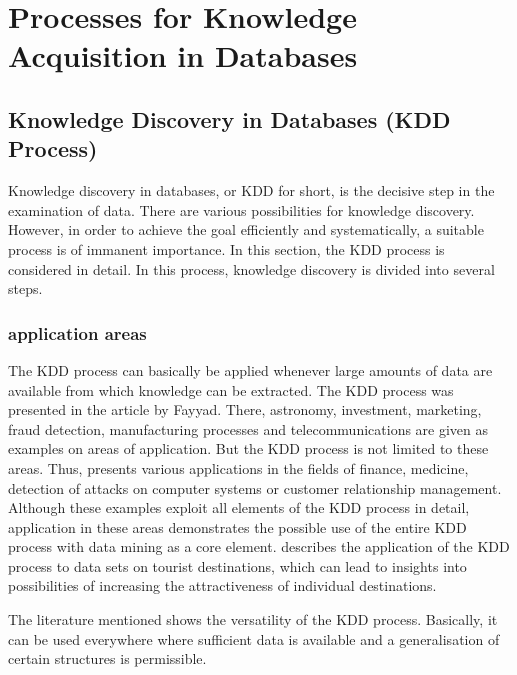 %
%


\chapter{Processes for Knowledge Acquisition in Databases}

\section{Knowledge Discovery in Databases (KDD Process)}

Knowledge discovery in databases, or KDD for short, is the decisive step in the examination of data. There are various possibilities for knowledge discovery. However, in order to achieve the goal efficiently and systematically, a suitable process is of immanent importance. In this section, the KDD process is considered in detail. In this process, knowledge discovery is divided into several steps.  \cite{Dusing.2000}

\subsection{application areas}
The KDD process can basically be applied whenever large amounts of data are available from which knowledge can be extracted. The KDD process was presented in the article by Fayyad. \cite{Fayyad:1996}  There, astronomy, investment, marketing, fraud detection, manufacturing processes and telecommunications are given as examples on areas of application. But the KDD process is not limited to these areas. Thus, \cite{Maimon:2010} presents various applications in the fields of finance, medicine, detection of attacks on computer systems or customer relationship management. Although these examples exploit all elements of the KDD process in detail, application in these areas demonstrates the possible use of the entire KDD process with data mining as a core element. \cite{Pyo:2002} describes the application of the KDD process to data sets on tourist destinations, which can lead to insights into possibilities of increasing the attractiveness of individual destinations.

The literature mentioned shows the versatility of the KDD process. Basically, it can be used everywhere where sufficient data is available and a generalisation of certain structures is permissible. 


